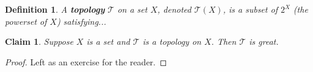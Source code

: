 \documentclass{article}
\newtheorem{defn}{Definition}
\newtheorem{claim}{Claim}
\begin{document}
\begin{defn}
A \textbf{topology} $\mathcal{T}$ on a set $X$, denoted $\mathcal{T}(X)$, is a subset of $2^X$ (the powerset of $X$) satisfying...
\end{defn}

\begin{claim}
Suppose $X$ is a set and $\mathcal{T}$ is a topology on $X$. Then $\mathcal{T}$ is great.
\end{claim}

\begin{proof}
Left as an exercise for the reader.
\end{proof}
\end{document}
